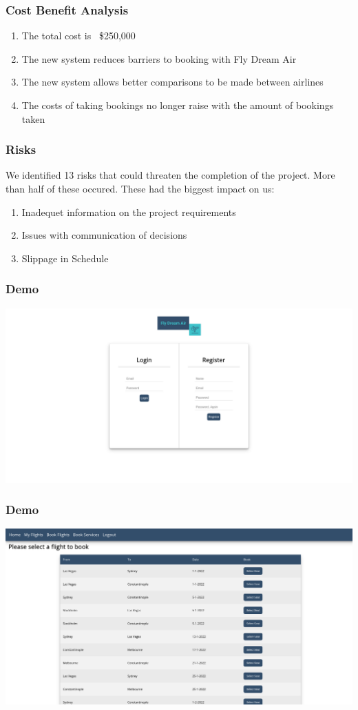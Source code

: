 \documentclass[12pt]{beamer}
\begin{document}
\begin{frame}[plain]
  \frametitle{Cost Benefit Analysis}
  \begin{enumerate}
  \item The total cost is ~\$250,000
  \item The new system reduces barriers to booking with Fly Dream Air
  \item The new system allows better comparisons to be made between airlines
  \item The costs of taking bookings no longer raise with the amount of bookings taken  
  \end{enumerate}
\end{frame}

\begin{frame}[plain]
  \frametitle{Risks}
  We identified 13 risks that could threaten the completion of the project. More than half of these occured. These had the biggest impact on us:
  \begin{enumerate}
  \item Inadequet information on the project requirements
  \item Issues with communication of decisions
  \item Slippage in Schedule
  \end{enumerate}
\end{frame}

\begin{frame}[plain]
  \frametitle{Demo}
  \includegraphics[width=\textwidth]{login}
\end{frame}

\begin{frame}[plain]
  \frametitle{Demo}
  \includegraphics[width=\textwidth]{flights}
\end{frame}
\end{document}
